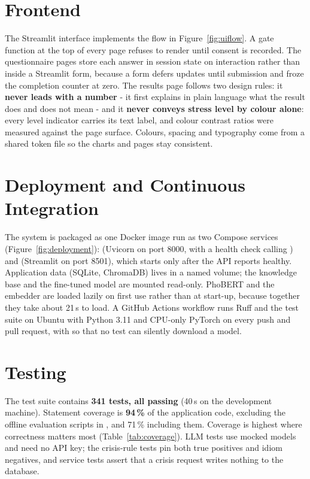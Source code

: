 
\section{Frontend}
The Streamlit interface implements the flow in Figure~\ref{fig:uiflow}. A gate function at the top of every page refuses to render until consent is recorded. The questionnaire pages store each answer in session state on interaction rather than inside a Streamlit form, because a form defers updates until submission and froze the completion counter at zero. The results page follows two design rules: it \textbf{never leads with a number} - it first explains in plain language what the result does and does not mean - and it \textbf{never conveys stress level by colour alone}: every level indicator carries its text label, and colour contrast ratios were measured against the page surface. Colours, spacing and typography come from a shared token file so the charts and pages stay consistent.


\section{Deployment and Continuous Integration}
The system is packaged as one Docker image run as two Compose services (Figure~\ref{fig:deployment}):  (Uvicorn on port 8000, with a health check calling ) and  (Streamlit on port 8501), which starts only after the API reports healthy. Application data (SQLite, ChromaDB) lives in a named volume; the knowledge base and the fine-tuned model are mounted read-only. PhoBERT and the embedder are loaded lazily on first use rather than at start-up, because together they take about 21\,s to load. A GitHub Actions workflow runs Ruff and the test suite on Ubuntu with Python 3.11 and CPU-only PyTorch on every push and pull request, with  so that no test can silently download a model.


\section{Testing}
The test suite contains \textbf{341 tests, all passing} (40\,s on the development machine). Statement coverage is \textbf{94\,\%} of the application code, excluding the offline evaluation scripts in , and 71\,\% including them. Coverage is highest where correctness matters most (Table~\ref{tab:coverage}). LLM tests use mocked models and need no API key; the crisis-rule tests pin both true positives and idiom negatives, and service tests assert that a crisis request writes nothing to the database.

